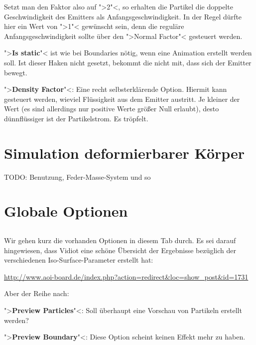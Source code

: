 \documentclass[10pt,DIV=14,a4paper]{scrartcl}
\begin{document}
	Setzt man den Faktor also auf ">2"<, so erhalten die Partikel die
	doppelte Geschwindigkeit des Emitters als Anfangsgeschwindigkeit. In
	der Regel dürfte hier ein Wert von ">1"< gewünscht sein, denn die
	reguläre Anfangsgeschwindigkeit sollte über den ">Normal Factor"<
	gesteuert werden.

	\item ">\textbf{Is static}"< ist wie bei Boundaries nötig, wenn eine
	Animation erstellt werden soll. Ist dieser Haken nicht gesetzt,
	bekommt die \fluidsim nicht mit, dass sich der Emitter bewegt.

	\item ">\textbf{Density Factor}"<: Eine recht selbsterklärende
	Option. Hiermit kann gesteuert werden, wieviel Flüssigkeit aus dem
	Emitter austritt. Je kleiner der Wert (es sind allerdings nur
	positive Werte größer Null erlaubt), desto dünnflüssiger ist der
	Partikelstrom. Es tröpfelt.

\itE




\pagebreak
\section{Simulation deformierbarer Körper}
TODO: Benutzung, Feder-Masse-System und so


\pagebreak
\section{Globale Optionen}

\subsection{}
Wir gehen kurz die vorhanden Optionen in diesem Tab durch. Es sei darauf
hingewiesen, dass Vidiot eine schöne Übersicht der Ergebnisse bezüglich
der verschiedenen Iso-Surface-Parameter erstellt hat:

\url{http://www.aoi-board.de/index.php?action=redirect&loc=show_post&id=1731}

Aber der Reihe nach:

\itA
	\item ">\textbf{Preview Particles}"<: Soll überhaupt eine Vorschau
	von Partikeln erstellt werden?

	\item ">\textbf{Preview Boundary}"<: Diese Option scheint keinen
	Effekt mehr zu haben.
\end{document}

